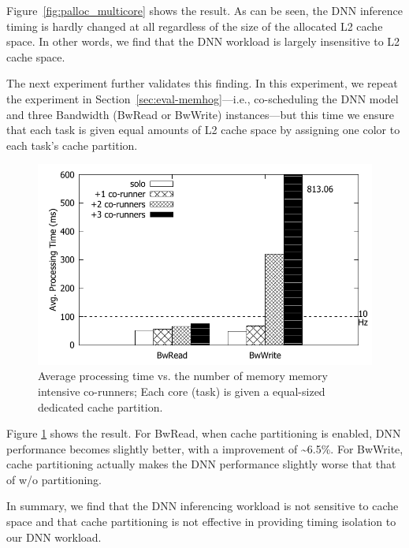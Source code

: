 Figure~\ref{fig:palloc_multicore} shows the result. As can be seen,
the DNN inference timing is hardly changed at all regardless of the
size of the allocated L2 cache space. In other words, we find that
the DNN workload is largely insensitive to L2 cache space.

The next experiment further validates this finding. In this
experiment, we repeat the experiment in
Section~\ref{sec:eval-memhog}---i.e., co-scheduling the DNN model and
three Bandwidth (BwRead or BwWrite) instances---but this time we
ensure that each task is given equal amounts of L2 cache space by
assigning one color to each task's cache partition.

\begin{figure}[h]
  \centering
  \includegraphics[width=.45\textwidth]{figs/palloc_bandwidth_exectime}
  \caption{Average processing time vs. the number of memory
memory intensive co-runners; Each core (task) is given a equal-sized
dedicated cache partition.}
  \label{fig:palloc_bandwidth_exectime}
\end{figure}

Figure \ref{fig:palloc_bandwidth_exectime} shows the
result. For BwRead, when cache partitioning is enabled, DNN
performance becomes slightly better, with a improvement of  
\textasciitilde6.5\%. For BwWrite, cache partitioning actually makes
the DNN performance slightly worse that that of w/o partitioning.

In summary, we find that the DNN inferencing workload is not sensitive
to cache space and that cache partitioning is not effective in
providing timing isolation to our DNN workload.



